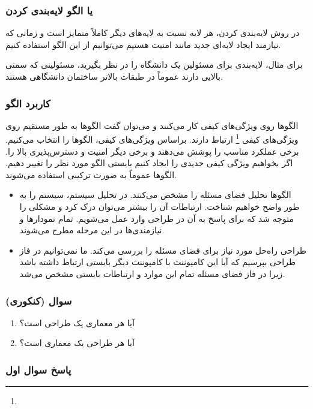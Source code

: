 \subsubsection{ یا الگو لایه‌بندی کردن}

در روش لایه‌بندی کردن، هر لایه نسبت به لایه‌های دیگر کاملاً متمایز است و زمانی
که نیازمند ایجاد لایه‌ای جدید مانند امنیت هستیم می‌توانیم از این الگو استفاده
کنیم.

برای مثال، لایه‌بندی برای مسئولین یک دانشگاه را در نظر بگیرید، مسئولینی که سمتی
بالایی دارند عموماً در طبقات بالاتر ساختمان دانشگاهی هستند.

\subsubsection{کاربرد الگو}

الگو‌ها روی ویژگی‌های کیفی کار می‌کنند و می‌توان گفت الگو‌ها به طور مستقیم روی
ویژگی‌های کیفی \footnote{} ارتباط دارند. براساس ویژگی‌های
کیفی، الگو‌ها را انتخاب می‌کنیم. برخی عملکرد مناسب را پوشش می‌دهند و برخی دیگر
امنیت و دسترس‌پذیری بالا را. اگر بخواهیم ویژگی کیفی جدیدی را ایجاد کنیم بایستی
الگو مورد نظر را تغییر دهیم. الگو‌ها عموماً به صورت ترکیبی استفاده می‌شوند.

\begin{itemize}
    \item الگو‌ها تحلیل فضای مسئله را مشخص می‌کنند. در تحلیل سیستم، سیستم را به
    طور واضح خواهیم شناخت. ارتباطات آن را بیشتر می‌توان درک کرد و مشکلی را متوجه
    شد که برای پاسخ به آن در طراحی وارد عمل می‌شویم. تمام نمودار‌ها و
    نیازمندی‌ها در این مرحله مطرح می‌شوند.
    \item طراحی راه‌حل مورد نیاز برای فضای مسئله را بررسی می‌کند. ما نمی‌توانیم
    در فاز طراحی بپرسیم که آیا این کامپوننت با کامپوننت دیگر بایستی ارتباط داشته
    باشد زیرا در فاز فضای مسئله تمام این موارد و ارتباطات بایستی مشخص می‌شد.
\end{itemize}

\subsubsection*{سوال (کنکوری)}

\begin{enumerate}
    \item آیا هر معماری یک طراحی است؟
    \item آیا هر طراحی یک معماری است؟
\end{enumerate}

\subsubsection*{پاسخ سوال اول}

